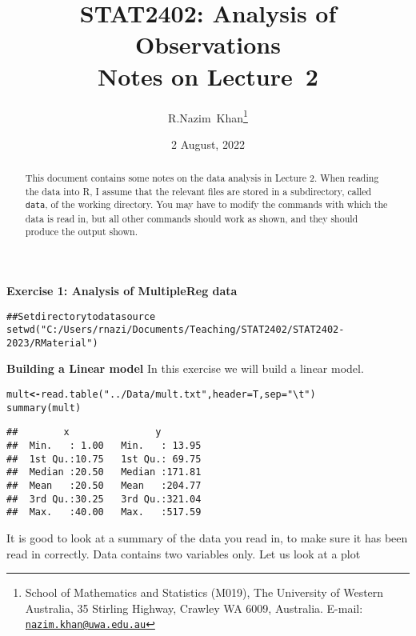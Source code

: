 \documentclass[11pt]{article}\usepackage[]{graphicx}\usepackage[]{xcolor}
\title{STAT2402: Analysis of Observations\\
  Notes on Lecture~2}
\author{R.Nazim~Khan\thanks{School of Mathematics and Statistics (M019), The
  University of Western Australia, 35 Stirling Highway, Crawley WA
  6009, Australia. E-mail: \href{mailto:nazim.khan@uwa.edu.au}
  {\texttt{nazim.khan@uwa.edu.au}}}}
\date{2 August, 2022}
\makeatletter
\newcommand{\hlstr}[1]{\textcolor[rgb]{0.651,0.522,0}{#1}}%
\newcommand{\hlcom}[1]{\textcolor[rgb]{1,0.502,0}{#1}}%
\newcommand{\hlstd}[1]{\textcolor[rgb]{0,0,0}{#1}}%
\newcommand{\hlkwb}[1]{\textcolor[rgb]{0.502,0.502,0.753}{\textbf{#1}}}%
\newcommand{\hlkwc}[1]{\textcolor[rgb]{0,0.502,0.753}{#1}}%
\newcommand{\hlkwd}[1]{\textcolor[rgb]{0,0.267,0.4}{#1}}%
\newenvironment{kframe}{%
 \def\at@end@of@kframe{}%
 \ifinner\ifhmode%
  \def\at@end@of@kframe{\end{minipage}}%
  \begin{minipage}{\columnwidth}%
 \fi\fi%
 \def\FrameCommand##1{\hskip\@totalleftmargin \hskip-\fboxsep
 \colorbox{shadecolor}{##1}\hskip-\fboxsep
     \hskip-\linewidth \hskip-\@totalleftmargin \hskip\columnwidth}%
 \MakeFramed {\advance\hsize-\width
   \@totalleftmargin\z@ \linewidth\hsize
   \@setminipage}}%
 {\par\unskip\endMakeFramed%
 \at@end@of@kframe}
\newenvironment{knitrout}{}{} %
\newcommand{\phead}[1]{{\bf{\color{mycol}#1}}}
\renewenvironment{knitrout}{%
  \begin{small}%
  \setlength{\topsep}{3.0pt plus 1.0pt minus 1.0pt}%
  \setlength{\partopsep}{1.0pt plus 1.0pt minus 1.0pt}%
  \setlength{\parskip}{0pt}}{\end{small}}
\def\R{\textsf{R}\xspace}
\makeatother
\begin{document}
\maketitle

\begin{abstract}
This document contains some notes on the data analysis in Lecture 2.
When reading the data into \R, I assume that the
relevant files are stored in a subdirectory, called \texttt{data},
of the working directory.  You may have to modify the commands
with which the data is read in, but all other commands should work
as shown, and they should produce the output shown.
\end{abstract}




  
\phead{Exercise 1: Analysis of MultipleReg data}
\begin{knitrout}
\color{fgcolor}\begin{kframe}
\begin{alltt}
\hlcom{## Set directory to data source}
\hlkwd{setwd}\hlstd{(}\hlstr{"C:/Users/rnazi/Documents/Teaching/STAT2402/STAT2402-2023/RMaterial"}\hlstd{)}
\end{alltt}
\end{kframe}
\end{knitrout}
\phead{Building a Linear model}
In this exercise we will build a linear model.
\begin{knitrout}
\color{fgcolor}\begin{kframe}
\begin{alltt}
\hlstd{mult} \hlkwb{<-} \hlkwd{read.table}\hlstd{(}\hlstr{"../Data/mult.txt"}\hlstd{,} \hlkwc{header} \hlstd{= T,} \hlkwc{sep} \hlstd{=} \hlstr{"\textbackslash{}t"}\hlstd{)}
\hlkwd{summary}\hlstd{(mult)}
\end{alltt}
\begin{verbatim}
##        x               y         
##  Min.   : 1.00   Min.   : 13.95  
##  1st Qu.:10.75   1st Qu.: 69.75  
##  Median :20.50   Median :171.81  
##  Mean   :20.50   Mean   :204.77  
##  3rd Qu.:30.25   3rd Qu.:321.04  
##  Max.   :40.00   Max.   :517.59
\end{verbatim}
\end{kframe}
\end{knitrout}
It is good to look at a summary of the data you read in, to make sure it has been read in correctly. Data contains two
variables only. Let us look at a plot
\end{document}
